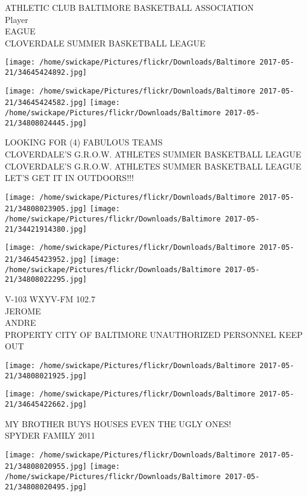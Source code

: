 \documentclass[10pt,letterpaper]{article}
\begin{document}
ATHLETIC CLUB BALTIMORE BASKETBALL ASSOCIATION\\
Player\\
EAGUE\\
CLOVERDALE SUMMER BASKETBALL LEAGUE\\
\pagebreak

\texttt{[image: /home/swickape/Pictures/flickr/Downloads/Baltimore 2017-05-21/34645424892.jpg]}

\vspace{0.25in}
\texttt{[image: /home/swickape/Pictures/flickr/Downloads/Baltimore 2017-05-21/34645424582.jpg]}
\texttt{[image: /home/swickape/Pictures/flickr/Downloads/Baltimore 2017-05-21/34808024445.jpg]}

LOOKING FOR (4) FABULOUS TEAMS\\
CLOVERDALE'S G.R.O.W. ATHLETES SUMMER BASKETBALL LEAGUE\\
CLOVERDALE'S G.R.O.W. ATHLETES SUMMER BASKETBALL LEAGUE LET'S GET IT IN OUTDOORS!!!\\
\pagebreak

\texttt{[image: /home/swickape/Pictures/flickr/Downloads/Baltimore 2017-05-21/34808023905.jpg]}
\texttt{[image: /home/swickape/Pictures/flickr/Downloads/Baltimore 2017-05-21/34421914380.jpg]}

\texttt{[image: /home/swickape/Pictures/flickr/Downloads/Baltimore 2017-05-21/34645423952.jpg]}
\texttt{[image: /home/swickape/Pictures/flickr/Downloads/Baltimore 2017-05-21/34808022295.jpg]}

V{-}103 WXYV{-}FM 102.7\\
JEROME\\
ANDRE\\
PROPERTY CITY OF BALTIMORE UNAUTHORIZED PERSONNEL KEEP OUT\\
\pagebreak

\texttt{[image: /home/swickape/Pictures/flickr/Downloads/Baltimore 2017-05-21/34808021925.jpg]}

\vspace{0.25in}
\texttt{[image: /home/swickape/Pictures/flickr/Downloads/Baltimore 2017-05-21/34645422662.jpg]}

MY BROTHER BUYS HOUSES EVEN THE UGLY ONES!\\
SPYDER FAMILY 2011\\
\pagebreak

\texttt{[image: /home/swickape/Pictures/flickr/Downloads/Baltimore 2017-05-21/34808020955.jpg]}
\texttt{[image: /home/swickape/Pictures/flickr/Downloads/Baltimore 2017-05-21/34808020495.jpg]}
\end{document}
